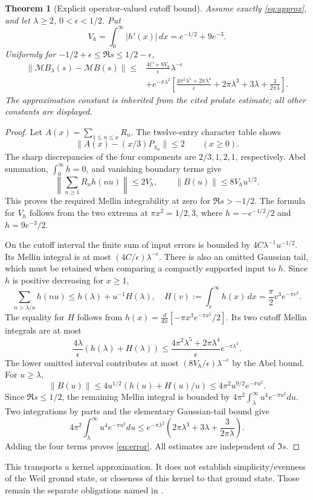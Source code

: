 \documentclass[11pt,reqno]{amsart}
\newtheorem{theorem}{Theorem}[section]
\theoremstyle{definition}\newtheorem{definition}[theorem]{Definition}
\theoremstyle{remark}\newtheorem{remark}[theorem]{Remark}
\newcommand{\M}{\mathcal M}\newcommand{\K}{\mathcal K}\newcommand{\E}{\mathcal E}
\begin{document}
\begin{theorem}[Explicit operator-valued cutoff bound]\label{thm:error}
Assume exactly \eqref{eq:approx}, and let $\lambda\ge2$, $0<\epsilon<1/2$. Put
\[
V_h=\int_0^\infty|h'(x)|\,dx=e^{-1/2}+9e^{-3}.
\]
Uniformly for $-1/2+\epsilon\le\Re s\le1/2-\epsilon$,
\begin{align}\label{eq:error}
\|\M B_\lambda(s)-\M B(s)\|\le{}&
\frac{4C+8V_h}{\epsilon}\lambda^{-\epsilon}\\
&+e^{-\pi\lambda^2}\left[
\frac{4\pi^2\lambda^5+2\pi\lambda^4}{\epsilon}
+2\pi\lambda^3+3\lambda+\frac{3}{2\pi\lambda}\right].\nonumber
\end{align}
The approximation constant is inherited from the cited prolate estimate; all other constants are displayed.
\end{theorem}
\begin{proof}
Let $A(x)=\sum_{1\le n\le x}R_n$. The twelve-entry character table shows
\[
\|A(x)-(x/3)P_{\chi_0}\|\le2\qquad(x\ge0).
\]
The sharp discrepancies of the four components are $2/3,1,2,1$, respectively. Abel summation, $\int_0^\infty h=0$, and vanishing boundary terms give
\[
\left\|\sum_{n\ge1}R_nh(nu)\right\|\le2V_h,
\qquad \|B(u)\|\le8V_hu^{1/2}.
\]
This proves the required Mellin integrability at zero for $\Re s>-1/2$. The formula for $V_h$ follows from the two extrema at $\pi x^2=1/2,3$, where $h=-e^{-1/2}/2$ and $h=9e^{-3}/2$.

On the cutoff interval the finite sum of input errors is bounded by $4C\lambda^{-1}u^{-1/2}$. Its Mellin integral is at most $(4C/\epsilon)\lambda^{-\epsilon}$. There is also an omitted Gaussian tail, which must be retained when comparing a compactly supported input to $h$. Since $h$ is positive decreasing for $x\ge1$,
\[
\sum_{n>\lambda/u}h(nu)\le h(\lambda)+u^{-1}H(\lambda),
\quad H(v):=\int_v^\infty h(x)\,dx=\frac\pi2v^3e^{-\pi v^2}.
\]
The equality for $H$ follows from $h(x)=\frac{d}{dx}[-\pi x^3e^{-\pi x^2}/2]$. Its two cutoff Mellin integrals are at most
\[
\frac{4\lambda}{\epsilon}(h(\lambda)+H(\lambda))
\le\frac{4\pi^2\lambda^5+2\pi\lambda^4}{\epsilon}e^{-\pi\lambda^2}.
\]
The lower omitted interval contributes at most $(8V_h/\epsilon)\lambda^{-\epsilon}$ by the Abel bound. For $u\ge\lambda$,
\[
\|B(u)\|\le4u^{1/2}(h(u)+H(u)/u)\le4\pi^2u^{9/2}e^{-\pi u^2}.
\]
Since $\Re s\le1/2$, the remaining Mellin integral is bounded by $4\pi^2\int_\lambda^\infty u^4e^{-\pi u^2}du$. Two integrations by parts and the elementary Gaussian-tail bound give
\[
4\pi^2\int_\lambda^\infty u^4e^{-\pi u^2}du
\le e^{-\pi\lambda^2}\left(2\pi\lambda^3+3\lambda+\frac{3}{2\pi\lambda}\right).
\]
Adding the four terms proves \eqref{eq:error}. All estimates are independent of $\Im s$.
\end{proof}
This transports a kernel approximation. It does not establish simplicity/evenness of the Weil ground state, or closeness of this kernel to that ground state. Those remain the separate obligations named in \cite[Section 8]{CCM}.
\end{document}
